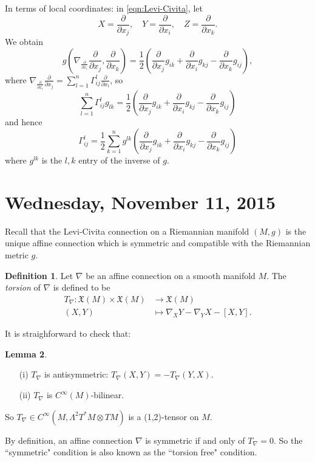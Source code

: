\documentclass{amsart}
\numberwithin{equation}{section}
\newcommand{\fX}{\mathfrak{X}}
\theoremstyle{definition}
\newtheorem{definition}{Definition} [section]
\theoremstyle{theorem}
\newtheorem{lemma}[definition]{Lemma}
\begin{document}
In terms of local coordinates: in \eqref{eqn:Levi-Civita}, let
$$
X=\frac{\partial}{\partial x_j},\quad Y=\frac{\partial}{\partial x_i},\quad
Z=\frac{\partial}{\partial x_k}.
$$
We obtain
\[
g(\nabla_{\frac{\partial}{\partial x_i}} \frac{\partial}{\partial x_j}, \frac{\partial}{\partial x_k}) = \frac{1}{2} \left( \frac{\partial}{\partial x_j} g_{ik} + \frac{\partial}{\partial x_i} g_{kj} - \frac{\partial}{\partial x_k} g_{ij}\right),
\]
where 
$\displaystyle{ \nabla_{\frac{\partial}{\partial x_i}} \frac{\partial}{\partial x_j}
=\sum_{l=1}^n \Gamma_{ij}^l 
\frac{\partial}{\partial x_l} }$, so 
\[
\sum_{l=1}^n \Gamma^l_{ij} g_{lk} = \frac{1}{2} \left( \frac{\partial}{\partial x_j} g_{ik} + \frac{\partial}{\partial x_i} g_{kj} - \frac{\partial}{\partial x_k} g_{ij}\right) 
\]
and hence 
\[
\Gamma_{ij}^l = \frac{1}{2} \sum_{k=1}^n g^{lk}( \frac{\partial}{\partial x_j} g_{ik} + \frac{\partial}{\partial x_i} g_{kj} - \frac{\partial}{\partial x_k} g_{ij})
\]
where $g^{lk}$ is the $l,k$ entry of the inverse of $g$. 







\section{Wednesday, November 11, 2015}

Recall that the Levi-Civita connection on a Riemannian manifold $(M,g)$ is
the unique affine connection which is symmetric and compatible with the Riemannian
metric $g$.

\begin{definition}
Let $\nabla$ be an affine connection on a smooth manifold $M$. The 
{\em torsion} of $\nabla$ is defined to be 
\begin{align*}
T_\nabla : \fX(M) \times \fX(M) &\to \fX(M) \\
(X,Y) &\mapsto  \nabla_XY - \nabla_YX - [X,Y].
\end{align*}
\end{definition}
It is straighforward to check that:
\begin {lemma}
\begin{enumerate}
\item[(i)] $T_\nabla$ is antisymmetric: $T_\nabla(X,Y)=-T_\nabla(Y,X)$.
\item[(ii)] $T_\nabla$ is $C^\infty(M)$-bilinear. 
\end{enumerate}
So $T_\nabla \in C^\infty(M, \Lambda^2 T^*M \otimes TM)$ is a (1,2)-tensor on $M$.
\end{lemma}
By definition, an affine connection $\nabla$ is symmetric if and only of $T_\nabla=0$. So 
the ``symmetric" condition is also known as the ``torsion free" condition.
\end{document}
